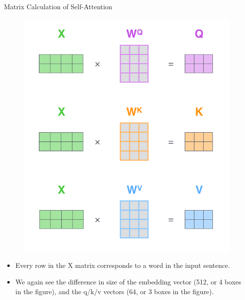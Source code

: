 \documentclass[handout]{beamer}
\begin{document}
\begin{frame}{Matrix Calculation of Self-Attention}

\begin{figure}[h]
        	\includegraphics[scale = 0.25]{pics/self-attention-matrix-calculation.png}
        \end{figure} 

\begin{scriptsize}
\begin{itemize}

\item Every row in the X matrix corresponds to a word in the input sentence.
\item We again see the difference in size of the embedding vector (512, or 4 boxes in the figure), and the q/k/v vectors (64, or 3 boxes in the figure).


\end{itemize}

\end{scriptsize}

\end{frame}
\end{document}
